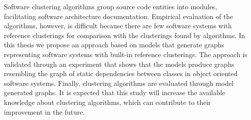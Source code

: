 Software clustering algorithms group source code entities into modules, facilitating software architecture documentation. Empirical evaluation of the algorithms, however, is difficult because there are few software systems with reference clusterings for comparison with the clusterings found by algorithms. In this thesis we propose an approach based on models that generate graphs representing software systems with built-in reference clusterings. The approach is validated through an experiment that shows that the models produce graphs resembling the graph of static dependencies between classes in object oriented software systems. Finally, clustering algorithms are evaluated through model generated graphs. It is expected that this study will increase the available knowledge about clustering algorithms, which can contribute to their improvement in the future.